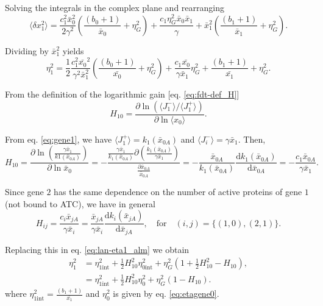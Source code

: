 Solving the integrals in the complex plane and rearranging
\begin{equation*}
  \langle \delta x_1^2\rangle = \frac{c_1^2\bar{x}_0^2}{2\gamma^2}\left(\frac{(b_0+1)}{\bar{x}_0}+ \eta_G^2\right) + \frac{c_1\eta_G^2\bar{x}_0\bar{x}_1}{\gamma} + \bar{x}_1^2\left(\frac{(b_1+1)}{\bar{x}_1}+\eta_G^2\right).
\end{equation*}

Dividing by $\bar{x}_1^2$ yields
\begin{equation}
  \label{eq:lan-eta1_alm}
  \eta_1^2 = \frac{1}{2}\frac{c_1^2\bar{x_0}^2}{\gamma^2\bar{x}_1^2}\left(\frac{(b_0+1)}{\bar{x_0}}+ \eta_G^2\right) + \frac{c_1\bar{x_0}}{\gamma \bar{x}_1}\eta_G^2 + \frac{(b_1+1)}{\bar{x_1}}+\eta_G^2.
\end{equation}

From the definition of the logarithmic gain [eq. \eqref{eq:fdt-def_H}]
\begin{equation*}
  H_{10} = \frac{\partial \ln (\langle J_1^-\rangle/\langle J_1^+\rangle)}{\partial \ln \langle x_0\rangle}.
\end{equation*}

From eq. \eqref{eq:gene1}, we have $\langle J_1^+\rangle = k_1(\bar{x}_{0A})$ and $\langle J_i^-\rangle = \gamma \bar{x}_1$. Then,
\begin{equation*}
  H_{10} = \frac{\partial \ln\left(\frac{\gamma\bar{x}_1}{k1(\bar{x}_{0A})}\right)}{\partial \ln  \bar{x}_0} = -\frac{\frac{\gamma \bar{x}_1}{k_1(\bar{x}_{0A})}\partial\left(\frac{k_1(\bar{x}_{0A})}{\gamma \bar{x}_1}\right)}{\frac{\partial \bar{x}_{0A}}{\bar{x}_{0A}}} = -\frac{\bar{x}_{0A}}{k_1(\bar{x}_{0A})}\frac{\mathrm{d} k_1(\bar{x}_{0A})}{\mathrm{d} \bar{x}_{0A}} = -\frac{c_1 \bar{x}_{0A}}{\gamma\bar{x}_1}.
\end{equation*}

Since gene $2$ has the same dependence on the number of active proteins of gene $1$ (not bound to ATC), we have in general
\begin{equation}
  \label{lan-Hexp}
  H_{ij} = \frac{c_i \bar{x}_{jA}}{\gamma\bar{x}_i} = \frac{\bar{x}_{jA}}{\gamma\bar{x}_i}\frac{\mathrm{d}k_i(\bar{x}_{jA})}{\mathrm{d} \bar{x}_{jA}},\quad\text{for}\quad (i,j) = \{(1,0),(2,1)\}.
\end{equation}

Replacing this in eq. \eqref{eq:lan-eta1_alm} we obtain
\begin{equation}
  \label{eq:etagene1}
  \begin{split} 
    \eta_1^2 &= \eta_{1\text{int}}^2+\frac{1}{2}H_{10}^2\eta_{0\text{int}}^2+\eta_G^2\left(1+ \frac{1}{2}H_{10}^2-H_{10}\right), \\
    &= \eta_{1\text{int}}^2 + \frac{1}{2}H_{10}^2\eta_0^2+\eta_G^2\left(1-H_{10}\right).
  \end{split}
\end{equation}
where $\eta_{1\text{int}}^2 = \frac{(b_1+1)}{\bar{x_1}}$ and $\eta_0^2$ is given by eq. \eqref{eq:etagene0}.

